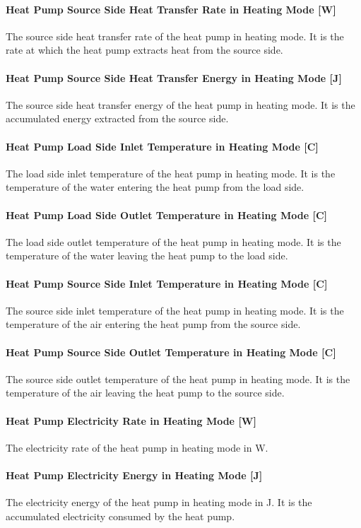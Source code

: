 \paragraph{Heat Pump Source Side Heat Transfer Rate in Heating Mode {[}W{]}} The
source side heat transfer rate of the heat pump in heating mode. It is the rate
at which the heat pump extracts heat from the source side.
\paragraph{Heat Pump Source Side Heat Transfer Energy in Heating Mode {[}J{]}}
The source side heat transfer energy of the heat pump in heating mode. It is the
accumulated energy extracted from the source side.
\paragraph{Heat Pump Load Side Inlet Temperature in Heating Mode {[}C{]}} The
load side inlet temperature of the heat pump in heating mode. It is the
temperature of the water entering the heat pump from the load side.
\paragraph{Heat Pump Load Side Outlet Temperature in Heating Mode {[}C{]}} The
load side outlet temperature of the heat pump in heating mode. It is the
temperature of the water leaving the heat pump to the load side.
\paragraph{Heat Pump Source Side Inlet Temperature in Heating Mode {[}C{]}} The
source side inlet temperature of the heat pump in heating mode. It is the
temperature of the air entering the heat pump from the source side.
\paragraph{Heat Pump Source Side Outlet Temperature in Heating Mode {[}C{]}} The
source side outlet temperature of the heat pump in heating mode. It is the
temperature of the air leaving the heat pump to the source side.
\paragraph{Heat Pump Electricity Rate in Heating Mode {[}W{]}} The electricity
rate of the heat pump in heating mode in W.
\paragraph{Heat Pump Electricity Energy in Heating Mode {[}J{]}} The electricity
energy of the heat pump in heating mode in J. It is the accumulated electricity
consumed by the heat pump.

